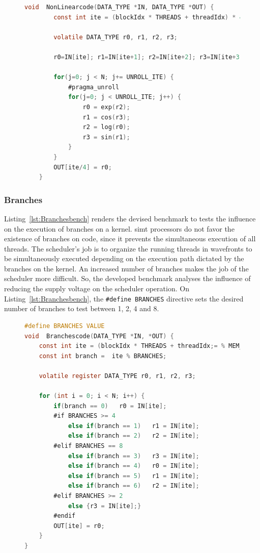 \begin{figure}[htpb]
    \begin{lstlisting}[language=C, caption=Non-linear Operations Benchmark Code, label=lst:NonLinearbench, basicstyle=\footnotesize\ttfamily, abovecaptionskip=0pt, captionpos=b]
    void  NonLinearcode(DATA_TYPE *IN, DATA_TYPE *OUT) {
        const int ite = (blockIdx * THREADS + threadIdx) * 4;
        
        volatile DATA_TYPE r0, r1, r2, r3;
        
        r0=IN[ite]; r1=IN[ite+1]; r2=IN[ite+2]; r3=IN[ite+3];  
        
        for(j=0; j < N; j+= UNROLL_ITE) {
            #pragma_unroll
            for(j=0; j < UNROLL_ITE; j++) {
                r0 = exp(r2);  
                r1 = cos(r3);
                r2 = log(r0);   
                r3 = sin(r1);
            }
        }
        OUT[ite/4] = r0;
    }
    \end{lstlisting}
\end{figure}

\subsubsection{Branches}

Listing~\ref{lst:Branchesbench} renders the devised benchmark to tests the influence on the execution of branches on a kernel. \acrshort{simt} processors do not favor the existence of branches on code, since it prevents the simultaneous execution of all threads. 
The scheduler's job is to organize the running threads in wavefronts to be simultaneously executed depending on the execution path dictated by the branches on the kernel. An increased number of branches makes the job of the scheduler more difficult. So, the developed benchmark analyses the influence of reducing the supply voltage on the scheduler operation. On Listing~\ref{lst:Branchesbench}, the \texttt{\#define BRANCHES} directive sets the desired number of branches to test between 1, 2, 4 and 8.

\begin{figure}[h]
\begin{lstlisting}[language=C, caption=Branches Benchmark Code, label=lst:Branchesbench, basicstyle=\footnotesize\ttfamily,abovecaptionskip=0pt, captionpos=b]
#define BRANCHES VALUE
void  Branchescode(DATA_TYPE *IN, *OUT) {
    const int ite = (blockIdx * THREADS + threadIdx;= % MEM_BLOCK;
    const int branch =  ite % BRANCHES;
    
    volatile register DATA_TYPE r0, r1, r2, r3;
    
    for (int i = 0; i < N; i++) {
        if(branch == 0)   r0 = IN[ite];
        #if BRANCHES >= 4
            else if(branch == 1)   r1 = IN[ite];
            else if(branch == 2)   r2 = IN[ite];
        #elif BRANCHES == 8
            else if(branch == 3)   r3 = IN[ite];
            else if(branch == 4)   r0 = IN[ite];
            else if(branch == 5)   r1 = IN[ite];
            else if(branch == 6)   r2 = IN[ite];
        #elif BRANCHES >= 2
            else {r3 = IN[ite];}
        #endif
        OUT[ite] = r0;
    }
}
\end{lstlisting}
\end{figure}

